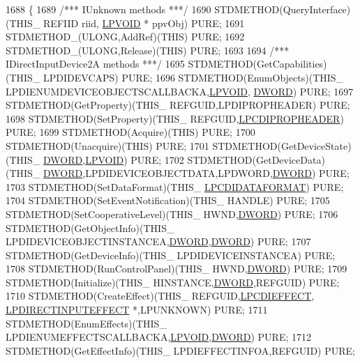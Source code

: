 \begin{DoxyCode}
1688 \{
1689     \textcolor{comment}{/*** IUnknown methods ***/}
1690     STDMETHOD(QueryInterface)(THIS\_ REFIID riid, \hyperlink{a00003_ae611cd6871649dbfe37273a0253d5e61}{LPVOID} * ppvObj) PURE;
1691     STDMETHOD\_(ULONG,AddRef)(THIS) PURE;
1692     STDMETHOD\_(ULONG,Release)(THIS) PURE;
1693 
1694     \textcolor{comment}{/*** IDirectInputDevice2A methods ***/}
1695     STDMETHOD(GetCapabilities)(THIS\_ LPDIDEVCAPS) PURE;
1696     STDMETHOD(EnumObjects)(THIS\_ LPDIENUMDEVICEOBJECTSCALLBACKA,\hyperlink{a00003_ae611cd6871649dbfe37273a0253d5e61}{LPVOID},
      \hyperlink{a00003_a50e15ae51c87ae06ab29c8148cb5f36c}{DWORD}) PURE;
1697     STDMETHOD(GetProperty)(THIS\_ REFGUID,LPDIPROPHEADER) PURE;
1698     STDMETHOD(SetProperty)(THIS\_ REFGUID,\hyperlink{a00003_aa73246465a32c316894f99e088564911}{LPCDIPROPHEADER}) PURE;
1699     STDMETHOD(Acquire)(THIS) PURE;
1700     STDMETHOD(Unacquire)(THIS) PURE;
1701     STDMETHOD(GetDeviceState)(THIS\_ \hyperlink{a00003_a50e15ae51c87ae06ab29c8148cb5f36c}{DWORD},\hyperlink{a00003_ae611cd6871649dbfe37273a0253d5e61}{LPVOID}) PURE;
1702     STDMETHOD(GetDeviceData)(THIS\_ \hyperlink{a00003_a50e15ae51c87ae06ab29c8148cb5f36c}{DWORD},LPDIDEVICEOBJECTDATA,LPDWORD,\hyperlink{a00003_a50e15ae51c87ae06ab29c8148cb5f36c}{DWORD}) PURE;
1703     STDMETHOD(SetDataFormat)(THIS\_ \hyperlink{a00003_ab7e0c3254f09795a4a2176cac228ba7d}{LPCDIDATAFORMAT}) PURE;
1704     STDMETHOD(SetEventNotification)(THIS\_ HANDLE) PURE;
1705     STDMETHOD(SetCooperativeLevel)(THIS\_ HWND,\hyperlink{a00003_a50e15ae51c87ae06ab29c8148cb5f36c}{DWORD}) PURE;
1706     STDMETHOD(GetObjectInfo)(THIS\_ LPDIDEVICEOBJECTINSTANCEA,\hyperlink{a00003_a50e15ae51c87ae06ab29c8148cb5f36c}{DWORD},\hyperlink{a00003_a50e15ae51c87ae06ab29c8148cb5f36c}{DWORD}) PURE;
1707     STDMETHOD(GetDeviceInfo)(THIS\_ LPDIDEVICEINSTANCEA) PURE;
1708     STDMETHOD(RunControlPanel)(THIS\_ HWND,\hyperlink{a00003_a50e15ae51c87ae06ab29c8148cb5f36c}{DWORD}) PURE;
1709     STDMETHOD(Initialize)(THIS\_ HINSTANCE,\hyperlink{a00003_a50e15ae51c87ae06ab29c8148cb5f36c}{DWORD},REFGUID) PURE;
1710     STDMETHOD(CreateEffect)(THIS\_ REFGUID,\hyperlink{a00003_a7913240b16286bfdcb811a35a982b236}{LPCDIEFFECT},
      \hyperlink{a00003_ac8278f319038d7db709c5ea828830fb9}{LPDIRECTINPUTEFFECT} *,LPUNKNOWN) PURE;
1711     STDMETHOD(EnumEffects)(THIS\_ LPDIENUMEFFECTSCALLBACKA,\hyperlink{a00003_ae611cd6871649dbfe37273a0253d5e61}{LPVOID},\hyperlink{a00003_a50e15ae51c87ae06ab29c8148cb5f36c}{DWORD}) PURE;
1712     STDMETHOD(GetEffectInfo)(THIS\_ LPDIEFFECTINFOA,REFGUID) PURE;

\end{DoxyCode}
